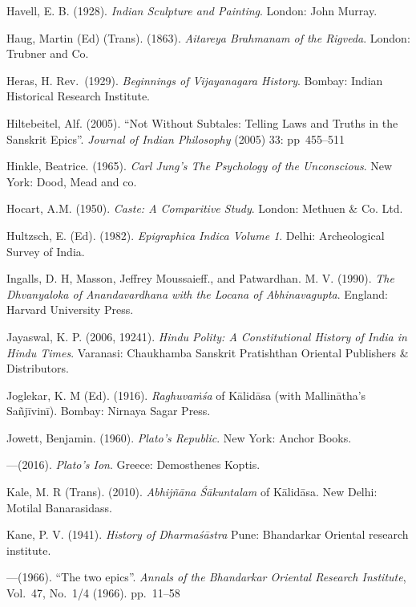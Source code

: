 \begin{thebibliography}{99}
Havell, E. B. (1928). {\sl Indian Sculpture and Painting}. London: John Murray. 

Haug, Martin (Ed) (Trans). (1863). {\sl Aitareya Brahmanam of the Rigveda}. London: Trubner and Co. 

Heras, H. Rev.\ (1929). {\sl Beginnings of Vijayanagara History}. Bombay: Indian Historical Research Institute. 

Hiltebeitel, Alf. (2005). “Not Without Subtales: Telling Laws and Truths in the Sanskrit Epics”. {\sl Journal 
of Indian Philosophy} (2005) 33: pp~455--511

Hinkle, Beatrice. (1965). {\sl Carl Jung’s The Psychology of the Unconscious}. New York: Dood, Mead and co. 

Hocart, A.M. (1950). {\sl Caste: A Comparitive Study}. London: Methuen \& Co. Ltd. 

Hultzsch, E. (Ed). (1982). {\sl Epigraphica Indica Volume 1}. Delhi: Archeological Survey of India. 

Ingalls, D. H,  Masson, Jeffrey Moussaieff., and Patwardhan. M. V. (1990). {\sl The Dhvanyaloka of 
Anandavardhana with the Locana of Abhinavagupta}. England: Harvard University Press. 

Jayaswal, K. P. (2006, 19241). {\sl Hindu Polity: A Constitutional History of India in Hindu Times}. Varanasi: Chaukhamba Sanskrit Pratishthan Oriental Publishers \& Distributors. 

Joglekar, K. M (Ed). (1916). {\sl Raghuvaṁśa} of Kālidāsa (with Mallinātha’s Sañjīvinī). Bombay: Nirnaya Sagar Press.  

Jowett, Benjamin. (1960). {\sl Plato’s Republic}. New York: Anchor Books. 

---\kern3pt(2016). {\sl Plato’s Ion}. Greece: Demosthenes Koptis. 

Kale, M. R (Trans). (2010). {\sl Abhijñāna Śākuntalam} of Kālidāsa. New Delhi: Motilal Banarasidass. 

Kane, P. V. (1941). {\sl History of Dharmaśāstra} Pune: Bhandarkar Oriental research institute. 

---\kern3pt(1966). “The two epics”. {\sl Annals of the Bhandarkar Oriental Research Institute}, Vol.~47, No.~1/4 (1966). pp.~11--58 


\end{thebibliography}
